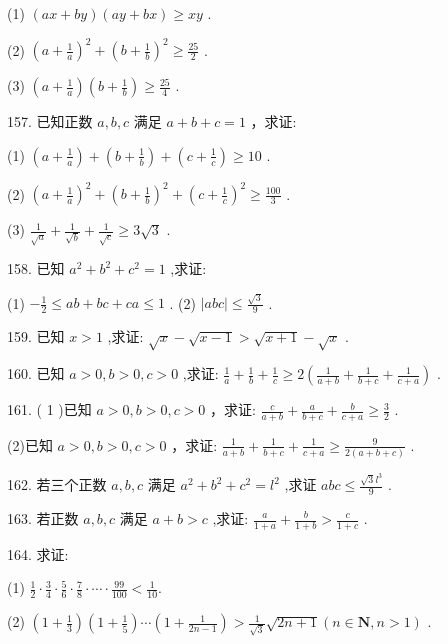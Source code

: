 \documentclass[10pt]{article}
\begin{document}
(1) \(\left( {{ax} + {by}}\right) \left( {{ay} + {bx}}\right)  \geq  {xy}\) .

(2) \({\left( a + \frac{1}{a}\right) }^{2} + {\left( b + \frac{1}{b}\right) }^{2} \geq  \frac{25}{2}\) .

(3) \(\left( {a + \frac{1}{a}}\right) \left( {b + \frac{1}{b}}\right)  \geq  \frac{25}{4}\) .

157. 已知正数 \(a,b,c\) 满足 \(a + b + c = 1\) ，求证:

(1) \(\left( {a + \frac{1}{a}}\right)  + \left( {b + \frac{1}{b}}\right)  + \left( {c + \frac{1}{c}}\right)  \geq  {10}\) .

(2) \({\left( a + \frac{1}{a}\right) }^{2} + {\left( b + \frac{1}{b}\right) }^{2} + {\left( c + \frac{1}{c}\right) }^{2} \geq  \frac{100}{3}\) .

(3) \(\frac{1}{\sqrt{a}} + \frac{1}{\sqrt{b}} + \frac{1}{\sqrt{c}} \geq  {3\sqrt{3}}\) .

158. 已知 \({a}^{2} + {b}^{2} + {c}^{2} = 1\) ,求证:

(1) \(- \frac{1}{2} \leq  {ab} + {bc} + {ca} \leq  1\) . (2) \(\left| {abc}\right|  \leq  \frac{\sqrt{3}}{9}\) .

159. 已知 \(x > 1\) ,求证: \(\sqrt{x} - \sqrt{x - 1} > \sqrt{x + 1} - \sqrt{x}\) .

160. 已知 \(a > 0,b > 0,c > 0\) ,求证: \(\frac{1}{a} + \frac{1}{b} + \frac{1}{c} \geq  2\left( {\frac{1}{a + b} + \frac{1}{b + c} + \frac{1}{c + a}}\right)\) .

161. ( 1 )已知 \(a > 0,b > 0,c > 0\) ，求证: \(\frac{c}{a + b} + \frac{a}{b + c} + \frac{b}{c + a} \geq  \frac{3}{2}\) .

(2)已知 \(a > 0,b > 0,c > 0\) ，求证: \(\frac{1}{a + b} + \frac{1}{b + c} + \frac{1}{c + a} \geq  \frac{9}{2\left( {a + b + c}\right) }\) .

162. 若三个正数 \(a,b,c\) 满足 \({a}^{2} + {b}^{2} + {c}^{2} = {l}^{2}\) ,求证 \({abc} \leq  \frac{\sqrt{3}{l}^{3}}{9}\) .

163. 若正数 \(a,b,c\) 满足 \(a + b > c\) ,求证: \(\frac{a}{1 + a} + \frac{b}{1 + b} > \frac{c}{1 + c}\) .

164. 求证:

(1) \(\frac{1}{2} \cdot  \frac{3}{4} \cdot  \frac{5}{6} \cdot  \frac{7}{8} \cdot  \cdots  \cdot  \frac{99}{100} < \frac{1}{10}.\)

(2) \(\left( {1 + \frac{1}{3}}\right) \left( {1 + \frac{1}{5}}\right) \cdots \left( {1 + \frac{1}{{2n} - 1}}\right)  > \frac{1}{\sqrt{3}}\sqrt{{2n} + 1}\left( {n \in  \mathbf{N},n > 1}\right)\) .
\end{document}
